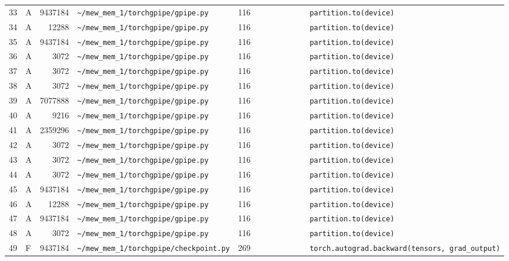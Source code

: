 \documentclass{article}
\begin{document}
\begin{longtable}{r l r p{6.5cm} r p{7.0cm}}
33 & A & 9437184 & \lstinline|~/mew_mem_1/torchgpipe/gpipe.py| & 116 & \lstinline|            partition.to(device)| \\
34 & A & 12288 & \lstinline|~/mew_mem_1/torchgpipe/gpipe.py| & 116 & \lstinline|            partition.to(device)| \\
35 & A & 9437184 & \lstinline|~/mew_mem_1/torchgpipe/gpipe.py| & 116 & \lstinline|            partition.to(device)| \\
36 & A & 3072 & \lstinline|~/mew_mem_1/torchgpipe/gpipe.py| & 116 & \lstinline|            partition.to(device)| \\
37 & A & 3072 & \lstinline|~/mew_mem_1/torchgpipe/gpipe.py| & 116 & \lstinline|            partition.to(device)| \\
38 & A & 3072 & \lstinline|~/mew_mem_1/torchgpipe/gpipe.py| & 116 & \lstinline|            partition.to(device)| \\
39 & A & 7077888 & \lstinline|~/mew_mem_1/torchgpipe/gpipe.py| & 116 & \lstinline|            partition.to(device)| \\
40 & A & 9216 & \lstinline|~/mew_mem_1/torchgpipe/gpipe.py| & 116 & \lstinline|            partition.to(device)| \\
41 & A & 2359296 & \lstinline|~/mew_mem_1/torchgpipe/gpipe.py| & 116 & \lstinline|            partition.to(device)| \\
42 & A & 3072 & \lstinline|~/mew_mem_1/torchgpipe/gpipe.py| & 116 & \lstinline|            partition.to(device)| \\
43 & A & 3072 & \lstinline|~/mew_mem_1/torchgpipe/gpipe.py| & 116 & \lstinline|            partition.to(device)| \\
44 & A & 3072 & \lstinline|~/mew_mem_1/torchgpipe/gpipe.py| & 116 & \lstinline|            partition.to(device)| \\
45 & A & 9437184 & \lstinline|~/mew_mem_1/torchgpipe/gpipe.py| & 116 & \lstinline|            partition.to(device)| \\
46 & A & 12288 & \lstinline|~/mew_mem_1/torchgpipe/gpipe.py| & 116 & \lstinline|            partition.to(device)| \\
47 & A & 9437184 & \lstinline|~/mew_mem_1/torchgpipe/gpipe.py| & 116 & \lstinline|            partition.to(device)| \\
48 & A & 3072 & \lstinline|~/mew_mem_1/torchgpipe/gpipe.py| & 116 & \lstinline|            partition.to(device)| \\
49 & F & 9437184 & \lstinline|~/mew_mem_1/torchgpipe/checkpoint.py| & 269 & \lstinline|            torch.autograd.backward(tensors, grad_output)| \\

\end{longtable}
\end{document}
